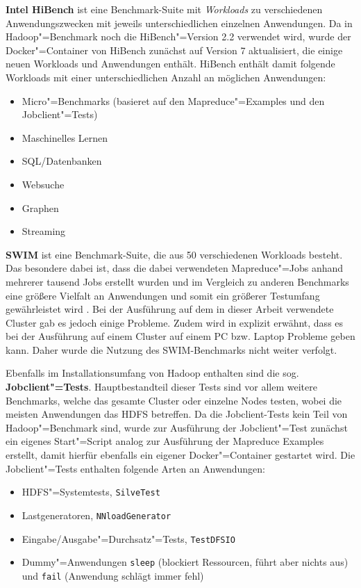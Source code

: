 \textbf{Intel HiBench} ist eine Benchmark-Suite mit \emph{Workloads} zu verschiedenen Anwendungszwecken mit jeweils unterschiedlichen einzelnen Anwendungen. Da in Hadoop"=Benchmark noch die HiBench"=Version \mbox{2.2} verwendet wird, wurde der Docker"=Container von HiBench zunächst auf Version 7 aktualisiert, die einige neuen Workloads und Anwendungen enthält. HiBench enthält damit folgende Workloads mit einer unterschiedlichen Anzahl an möglichen Anwendungen:

\begin{itemize}
    \item Micro"=Benchmarks (basieret auf den Mapreduce"=Examples und den Jobclient"=Tests)
    \item Maschinelles Lernen
    \item SQL/Datenbanken
    \item Websuche
    \item Graphen
    \item Streaming
\end{itemize}

\textbf{\ac{SWIM}} ist eine Benchmark-Suite, die aus 50 verschiedenen Workloads besteht. Das besondere dabei ist, dass die dabei verwendeten Mapreduce"=Jobs anhand mehrerer tausend Jobs erstellt wurden und im Vergleich zu anderen Benchmarks eine größere Vielfalt an Anwendungen und somit ein größerer Testumfang gewährleistet wird \cite{SwimWikiHome}. Bei der Ausführung auf dem in dieser Arbeit verwendete Cluster gab es jedoch einige Probleme. Zudem wird in \cite{InriaTutorial} explizit erwähnt, dass es bei der Ausführung auf einem Cluster auf einem PC bzw. Laptop Probleme geben kann. Daher wurde die Nutzung des SWIM-Benchmarks nicht weiter verfolgt.

Ebenfalls im Installationsumfang von Hadoop enthalten sind die sog. \textbf{Jobclient"=Tests}. Hauptbestandteil dieser Tests sind vor allem weitere Benchmarks, welche das gesamte Cluster oder einzelne Nodes testen, wobei die meisten Anwendungen das HDFS betreffen. Da die Jobclient-Tests kein Teil von Hadoop"=Benchmark sind, wurde zur Ausführung der Jobclient"=Test zunächst ein eigenes Start"=Script analog zur Ausführung der Mapreduce Examples erstellt, damit hierfür ebenfalls ein eigener Docker"=Container gestartet wird. Die Jobclient"=Tests enthalten \uA folgende Arten an Anwendungen:

\begin{itemize}
    \item HDFS"=Systemtests, \zB \texttt{SilveTest}
    \item Lastgeneratoren, \zB \texttt{NNloadGenerator}
    \item Eingabe/Ausgabe"=Durchsatz"=Tests, \zB \texttt{TestDFSIO}
    \item Dummy"=Anwendungen \texttt{sleep} (blockiert Ressourcen, führt aber nichts aus) und \texttt{fail} (Anwendung schlägt immer fehl)
\end{itemize}
